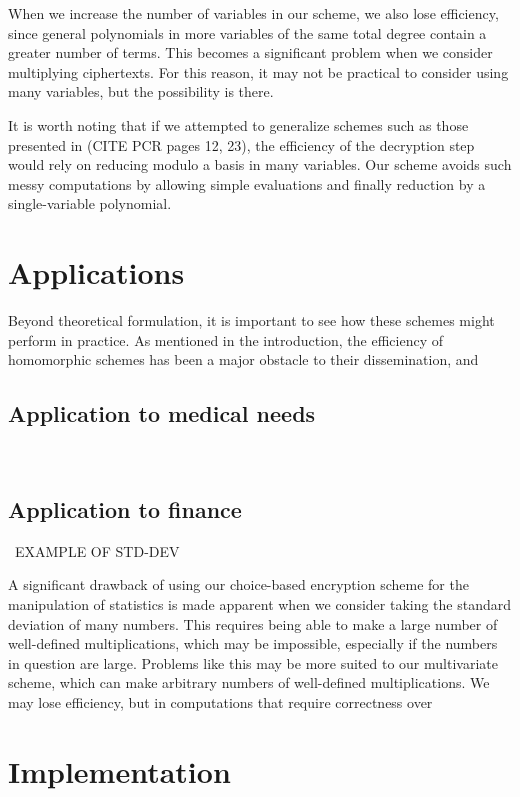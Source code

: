 \documentclass[11pt]{report}
\begin{document}
When we increase the number of variables in our scheme, we also lose efficiency, since general polynomials in more variables of the same total degree contain a greater number of terms. This becomes a significant problem when we consider multiplying ciphertexts. For this reason, it may not be practical to consider using many variables, but the possibility is there.

It is worth noting that if we attempted to generalize schemes such as those presented in (CITE PCR pages 12, 23), the efficiency of the decryption step would rely on reducing modulo a basis in many variables. Our scheme avoids such messy computations by allowing simple evaluations and finally reduction by a single-variable polynomial.


\chapter{Applications}

Beyond theoretical formulation, it is important to see how these schemes might perform in practice. As mentioned in the introduction, the efficiency of homomorphic schemes has been a major obstacle to their dissemination, and 

\section{Application to medical needs}

\

\section{Application to finance}

\ EXAMPLE OF STD-DEV

A significant drawback of using our choice-based encryption scheme for the manipulation of statistics is made apparent when we consider taking the standard deviation of many numbers. This requires being able to make a large number of well-defined multiplications, which may be impossible, especially if the numbers in question are large. Problems like this may be more suited to our multivariate scheme, which can make arbitrary numbers of well-defined multiplications. We may lose efficiency, but in computations that require correctness over

\chapter{Implementation}
\label{chap:implementation}
\end{document}
